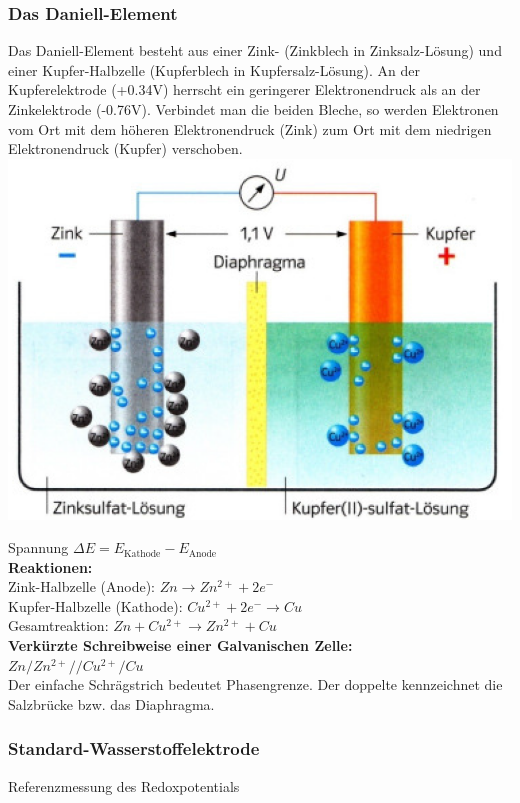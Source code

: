 \subsubsection{Das Daniell-Element}
Das Daniell-Element besteht aus einer Zink- (Zinkblech in Zinksalz-Lösung) und einer Kupfer-Halbzelle (Kupferblech in Kupfersalz-Lösung). An der Kupferelektrode (+0.34V) herrscht ein geringerer Elektronendruck als an der Zinkelektrode (-0.76V). Verbindet man die beiden Bleche, so werden Elektronen vom Ort mit dem höheren Elektronendruck (Zink) zum Ort mit dem niedrigen Elektronendruck (Kupfer) verschoben.\\
\includegraphics[width=0.7\linewidth]{images/10_Daniell_Element.png}

Spannung $\Delta E = E_\text{Kathode}-E_\text{Anode}$ \\

\textbf{Reaktionen:}\\
Zink-Halbzelle (Anode): $Zn \rightarrow Zn^{2+} + 2 e^-$ \\
Kupfer-Halbzelle (Kathode): $Cu^{2+} + 2 e^- \rightarrow Cu$ \\
Gesamtreaktion: $Zn + Cu^{2+} \rightarrow Zn^{2+} + Cu$\\

\textbf{Verkürzte Schreibweise einer Galvanischen Zelle:}\\
$Zn/Zn^{2+} // Cu^{2+}/Cu$\\
Der einfache Schrägstrich bedeutet Phasengrenze. Der doppelte kennzeichnet die Salzbrücke bzw. das Diaphragma.

\subsubsection{Standard-Wasserstoffelektrode}
Referenzmessung des Redoxpotentials

